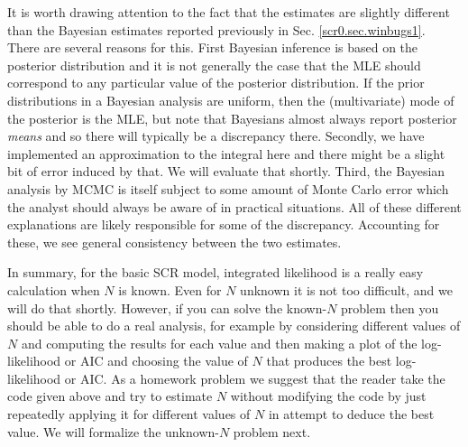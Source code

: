 It is worth drawing attention to the fact that the estimates are slightly
different than the Bayesian estimates reported previously in
Sec. \ref{scr0.sec.winbugs1}.   There are several reasons
for this.  First Bayesian inference is based on the posterior
distribution and it is not generally the case that the MLE should
correspond to any particular value of the posterior distribution. If
the prior distributions in a Bayesian analysis are uniform, then the
(multivariate) mode of the posterior is the MLE, but note that
Bayesians almost always report posterior {\it means} and so there will
typically be a discrepancy there. Secondly, we have implemented an
approximation to the integral here and there might be a slight bit of
error induced by that. We will evaluate that shortly. Third, the
Bayesian analysis by MCMC is itself subject to some amount of Monte Carlo
error which the analyst should always be aware of in practical
situations.  All of these different explanations are likely
responsible for some of the discrepancy. Accounting for these, we see
general consistency between the two estimates.

\begin{comment} 
To compute the integrated likelihood we used a discrete representation
of the state-space so that the integral could be approximated as a
summation over possible values of ${\bf s}$ with each value being
weighted by its probability of occurring, which is $1/nG$ under the
assumption that ${\bf s}$ is uniform on the state-space ${\cal
  S}$. Recall
in Chapt. \ref{chapt.scr0} we 
used a discrete state-space in developing a Bayesian analysis of the
model in order to be able to modify the state-space in a flexible
manner. In that case, we could use the discretized state-space as the
integration grid and just feed it into our integrated likelihood
routine. 
\end{comment}

In summary, for the basic SCR model, integrated
likelihood is a really easy calculation when $N$ is known. Even for $N$
unknown it is not too difficult, and we will do that shortly.
However, if you can solve the known-$N$ problem then you should be able
to do a real analysis, for example by considering different values of
$N$ and computing the results for each value and then making a plot of
the log-likelihood or AIC and choosing the value of $N$ that produces
the best log-likelihood or AIC. As a homework problem we suggest that
the reader take the code given above and try to estimate $N$ without
modifying the code by just repeatedly applying it for 
different values of $N$ in attempt to deduce the best value.
We will formalize the unknown-$N$ problem next.

